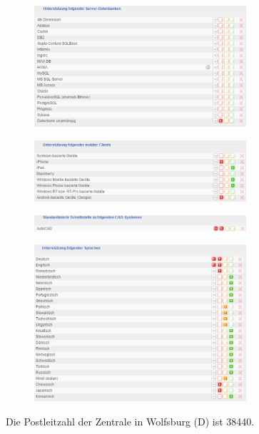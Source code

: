 \documentclass[12pt]{article}
\begin{document}
\noindent
\begin{figure}[here!]
\centering
\includegraphics[width=0.7\textwidth]{images/tr49}
\end{figure}\FloatBarrier
\noindent
\begin{figure}[here!]
\centering
\includegraphics[width=0.7\textwidth]{images/tr50}
\end{figure}\FloatBarrier
\noindent
\begin{figure}[here!]
\centering
\includegraphics[width=0.7\textwidth]{images/tr51}
\end{figure}\FloatBarrier
\noindent
\begin{figure}[here!]
\centering
\includegraphics[width=0.7\textwidth]{images/tr52}
\end{figure}\FloatBarrier
\noindent
Die Postleitzahl der Zentrale in Wolfsburg (D) ist 38440.
\end{document}

